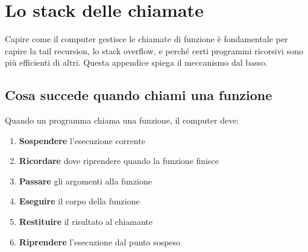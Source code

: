
\chapter{Lo stack delle chiamate}
\label{app:stack}

\begin{intuizione}
Capire come il computer gestisce le chiamate di funzione
è fondamentale per capire la tail recursion, lo stack overflow,
e perché certi programmi ricorsivi sono più efficienti di altri.
Questa appendice spiega il meccanismo dal basso.
\end{intuizione}

\vspace{4pt}

\section{Cosa succede quando chiami una funzione}

Quando un programma chiama una funzione, il computer deve:

\begin{enumerate}
  \item \textbf{Sospendere} l'esecuzione corrente
  \item \textbf{Ricordare} dove riprendere quando la funzione finisce
  \item \textbf{Passare} gli argomenti alla funzione
  \item \textbf{Eseguire} il corpo della funzione
  \item \textbf{Restituire} il risultato al chiamante
  \item \textbf{Riprendere} l'esecuzione dal punto sospeso
\end{enumerate}



